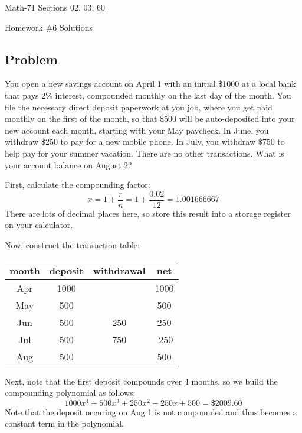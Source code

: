 \documentclass[letterpaper,12pt,fleqn]{article}
\begin{document}
\begin{center}
  \large
  Math-71 Sections 02, 03, 60

  \Large
  Homework \#6 Solutions
\end{center}

\subsection*{Problem}

You open a new savings account on April 1 with an initial \$1000 at a local bank that pays 2\% interest, compounded
monthly on the last day of the month.  You file the necessary direct deposit paperwork at you job, where you get
paid monthly on the first of the month, so that \$500 will be auto-deposited into your new account each month,
starting with your May paycheck.  In June, you withdraw \$250 to pay for a new mobile phone.  In July, you withdraw
\$750 to help pay for your summer vacation.  There are no other transactions.  What is your account balance on
August 2?

First, calculate the compounding factor:
\[x=1+\frac{r}{n}=1+\frac{0.02}{12}=1.001666667\]
There are lots of decimal places here, so store this result into a storage register on your calculator.

Now, construct the transaction table:

\begin{center}
  \begin{tabular}{|c|c|c|c|}
    \hline
    month & deposit & withdrawal & net \\
    \hline
    Apr & 1000 & & 1000 \\
    \hline
    May & 500 & & 500 \\
    \hline
    Jun & 500 & 250 & 250 \\
    \hline
    Jul & 500 & 750 & -250 \\
    \hline
    Aug & 500 & & 500 \\
    \hline
  \end{tabular}
\end{center}

Next, note that the first deposit compounds over 4 months, so we build the compounding polynomial as follows:
\[1000x^4+500x^3+250x^2-250x+500=\$2009.60\]
Note that the deposit occuring on Aug 1 is not compounded and thus becomes a constant term in the polynomial.
\end{document}
